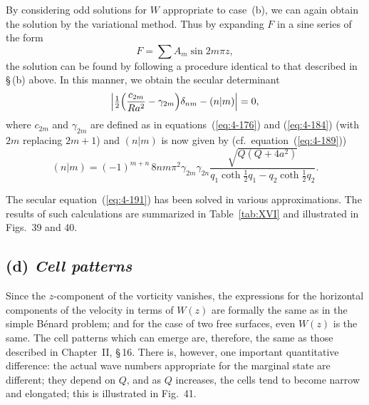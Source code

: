 By considering odd solutions for $W$ appropriate to case~(b), we can again obtain the solution by the variational method. Thus by expanding $F$ in a sine series of the form
\begin{equation}
\label{eq:4-190}
F = \sum A_m\sin 2m\pi z,
\end{equation}
the solution can be found by following a procedure identical to that described in \S\,(b) above. In this manner, we obtain the secular determinant
\begin{equation}
\label{eq:4-191}
\left|\tfrac{1}{2}\Bigl(\frac{c_{2m}}{Ra^2}-\gamma_{2m}\Bigr)\delta_{nm}-(n|m)\right| = 0,
\end{equation}
where $c_{2m}$ and $\gamma_{2m}$ are defined as in equations~(\ref{eq:4-176}) and (\ref{eq:4-184}) (with $2m$ replacing $2m+1$) and $(n|m)$ is now given by (cf.\ equation~(\ref{eq:4-189}))
\begin{equation}
\label{eq:4-192}
(n|m) = (-1)^{m+n}\,8nm\pi^2\gamma_{2m}\gamma_{2n}\frac{\sqrt{Q(Q+4a^2)}}{q_1\coth\tfrac{1}{2}q_1-q_2\coth\tfrac{1}{2}q_2}.
\end{equation}

The secular equation~(\ref{eq:4-191}) has been solved in various approximations. The results of such calculations are summarized in Table~\ref{tab:XVI} and illustrated in Figs.~39 and 40.

\subsection*{(d) \emph{Cell patterns}}

Since the $z$-component of the vorticity vanishes, the expressions for the horizontal components of the velocity in terms of $W(z)$ are formally the same as in the simple B\'enard problem; and for the case of two free surfaces, even $W(z)$ is the same. The cell patterns which can emerge are, therefore, the same as those described in Chapter~II, \S\,16. There is, however, one important quantitative difference: the actual wave numbers appropriate for the marginal state are different; they depend on $Q$, and as $Q$ increases, the cells tend to become narrow and elongated; this is illustrated in Fig.~41.


